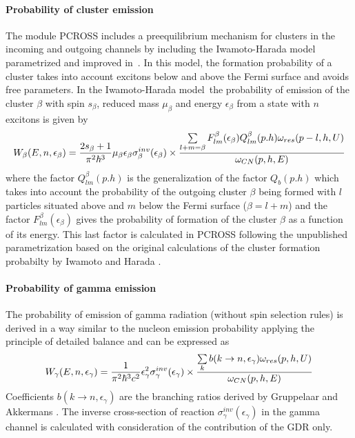 \paragraph{Probability of cluster emission}

The module PCROSS includes a preequilibrium mechanism for clusters in the
incoming and outgoing channels by including the Iwamoto-Harada model~\cite%
{iwha82} parametrized and improved in~\cite{saiwha83,za88,za89}. In this
model, the formation probability of a cluster takes into account excitons
below and above the Fermi surface and avoids free parameters. In the
Iwamoto-Harada model~the probability of emission of the cluster $\beta $
with spin $s_{\beta }$, reduced mass $\mu _{\beta }$ and energy $\epsilon
_{\beta }$ from a state with $n$ excitons is given by%
\begin{equation}
W_{\beta }(E,n,\epsilon _{\beta })=\frac{2s_{\beta }+1}{\pi ^{2}\hbar ^{3}}%
\mu _{\beta }\epsilon _{\beta }\sigma _{\beta }^{inv}(\epsilon _{\beta
})\times   \notag \\
\frac{\sum\limits_{l+m=\beta }F_{lm}^{\beta }(\epsilon _{\beta
})Q_{lm}^{\beta }(p.h)\omega _{res}(p-l,h,U)}{\omega _{CN}(p,h,E)}
\end{equation}%
where the factor $Q_{lm}^{\beta }(p.h)$ is the generalization of the factor $%
Q_{b}(p.h)$ which takes into account the probability of the outgoing cluster 
$\beta $ being formed with $l$ particles situated above and $m$ below the
Fermi surface ($\beta =l+m$) \cite{za89} and the factor $F_{lm}^{\beta
}(\epsilon _{\beta })$ gives the probability of formation of the cluster $%
\beta $ as a function of its energy. This last factor is calculated in
PCROSS following the unpublished parametrization based on the original
calculations of the cluster formation probabilty by Iwamoto and Harada \cite%
{iwha82}.

\paragraph{Probability of gamma emission}

The probability of emission of gamma radiation (without spin selection
rules) is derived in a way similar to the nucleon emission probability
applying the principle of detailed balance \cite{plpr78,bedo79,akgr85} and
can be expressed as%
\begin{equation}
W_{\gamma }(E,n,\epsilon _{\gamma })=\frac{1}{\pi ^{2}\hbar ^{3}c^{2}}%
\epsilon _{\gamma }^{2}\sigma _{\gamma }^{inv}(\epsilon _{\gamma })\times  
\notag \\
\frac{\sum\limits_{k}b(k\rightarrow n,\epsilon _{\gamma })\omega
_{res}(p,h,U)}{\omega _{CN}(p,h,E)}
\end{equation}%
Coefficients $b(k\rightarrow n,\epsilon _{\gamma })$ are the branching
ratios derived by Gruppelaar and Akkermans \cite{akgr85}. The inverse
cross-section of reaction $\sigma _{\gamma }^{inv}(\epsilon _{\gamma })$ in
the gamma channel is calculated with consideration of the contribution of
the GDR only.


